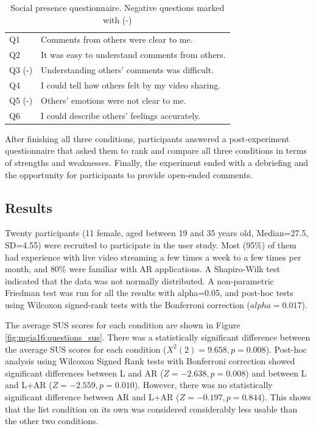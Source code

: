 \begin{table}[h]
  \centering
  \caption{Social presence questionnaire. Negative questions marked with (-)}
  \label{table:social_questions}
  \begin{tabular}{ll}
    Q1 & Comments from others were clear to me.          \\
    Q2 & It was easy to understand comments from others. \\
    Q3 (-) & Understanding others' comments was difficult.  \\
    Q4 & I could tell how others felt by my video sharing.\\
    Q5 (-) & Others' emotions were not clear to me.\\
    Q6 & I could describe others' feelings accurately.
  \end{tabular}
\end{table}


After finishing all three conditions, participants answered a post-experiment questionnaire that asked them to rank and compare all three conditions in terms of strengths and weaknesses. Finally, the experiment ended with a debriefing and the opportunity for participants to provide open-ended comments.

\subsection{Results}

Twenty participants (11 female, aged between 19 and 35 years old, Median=27.5, SD=4.55) were recruited to participate in the user study. Most (95\%) of them had experience with live video streaming a few times a week to a few times per month, and 80\% were familiar with AR applications. A Shapiro-Wilk test indicated that the data was not normally distributed. A non-parametric Friedman test was run for all the results with alpha=0.05, and post-hoc tests using Wilcoxon signed-rank tests with the Bonferroni correction ($alpha=0.017$).

The average SUS scores for each condition are shown in Figure \ref{fig:mgia16:questions_sus}. There was a statistically significant difference between the average SUS scores for each condition ($X^2(2)=9.658, p=0.008$). Post-hoc analysis using Wilcoxon Signed Rank tests with Bonferroni correction showed significant differences between L and AR ($Z=-2.638, p=0.008$) and between L and L+AR ($Z=-2.559, p=0.010$). However, there was no statistically significant difference between AR and L+AR ($Z=-0.197, p=0.844$). This shows that the list condition on its own was considered considerably less usable than the other two conditions.

